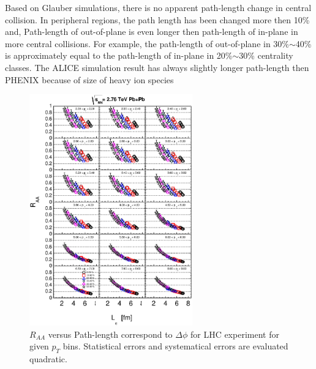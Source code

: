 Based on Glauber simulations, there is no apparent path-length change in central collision. In peripheral regions, the path length has been changed more then 10\% and, Path-length of out-of-plane is even longer then path-length of in-plane in more central collisions. For example, the path-length of out-of-plane in 30\%$\sim$40\% is approximately equal to the path-length of in-plane in 20\%$\sim$30\% centrality classes. The ALICE simulation result has always slightly longer path-length then PHENIX because of size of heavy ion species



\begin{figure}[htbp]
\begin{center}
\includegraphics[height=10cm]{figures/Fig_pathlength/fig4.eps}
\caption{ $R_{AA}$ versus Path-length correspond to $\Delta \phi$ for LHC experiment for given $p_{T}$ bins. Statistical errors and systematical errors are evaluated quadratic. }
\label{apendfig4}
\end{center}
\end{figure}

